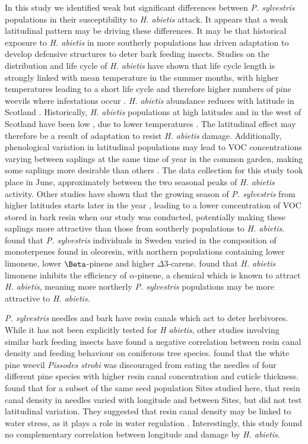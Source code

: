 \documentclass[a4paper, 11pt]{article}
\begin{document}
In this study we identified weak but significant differences between \textit{P. sylvestris} populations in their susceptibility to \textit{H. abietis} attack. It appears that a weak latitudinal pattern may be driving these differences. It may be that historical exposure to \textit{H. abietis} in more southerly populations has driven adaptation to develop defensive structures to deter bark feeding insects. Studies on the distribution and life cycle of \textit{H. abietis} have shown that life cycle length is strongly linked with mean temperature in the summer months, with higher temperatures leading to a short life cycle and therefore higher numbers of pine weevils where infestations occur \citep{Leather1999}. \textit{H. abietis} abundance reduces with latitude in Scotland \citep{Barredo2015}. Historically, \textit{H. abietis} populations at high latitudes and in the west of Scotland have been low \citep{Leather1999}, due to lower temperatures \citep{Wainhouse2014}. The latitudinal effect may therefore be a result of adaptation to resist \textit{H. abietis} damage. Additionally, phenological variation in latitudinal populations may lead to VOC concentrations varying between saplings at the same time of year in the common garden, making some saplings more desirable than others \citep{Guenther1997}. The data collection for this study took place in June, approximately between the two seasonal peaks of \textit{H. abietis} activity. Other studies have shown that the growing season of \textit{P. sylvestris} from higher latitudes starts later in the year \citep{Salmela2013}, leading to a lower concentration of VOC stored in bark resin when our study was conducted, potentially making these saplings more attractive than those from southerly populations to \textit{H. abietis}. \citet{Yazdani1985} found that \textit{P. sylvestris} individuals in Sweden varied in the composition of monoterpenes found in oleoresin, with northern populations containing lower limonene, lower $\Beta$-pinene and higher $\Delta$3-carene. \citet{Nordlander1990} found that \textit{H. abietis} limonene inhibits the efficiency of $\alpha$-pinene, a chemical which is known to attract \textit{H. abietis}, meaning more northerly \textit{P. sylvestris} populations may be more attractive to \textit{H. abietis}.

\textit{P. sylvestris} needles and bark have resin canals which act to deter herbivores. While it has not been explicitly tested for \textit{H abietis}, other studies involving similar bark feeding insects have found a negative correlation between resin canal density and feeding behaviour on coniferous tree species. \citet{Boucher2001} found that the white pine weevil \textit{Pissodes strobi} was discouraged from eating the needles of four different pine species with higher resin canal concentration and cuticle thickness. \citet{Donnelly2016} found that for a subset of the same seed population Sites studied here, that resin canal density in needles varied with longitude and between Sites, but did not test latitudinal variation. They suggested that resin canal density may be linked to water stress, as it plays a role in water regulation \citep{Farrell1991}. Interestingly, this study found no complementary correlation between longitude and damage by \textit{H. abietis}. 
\end{document}
